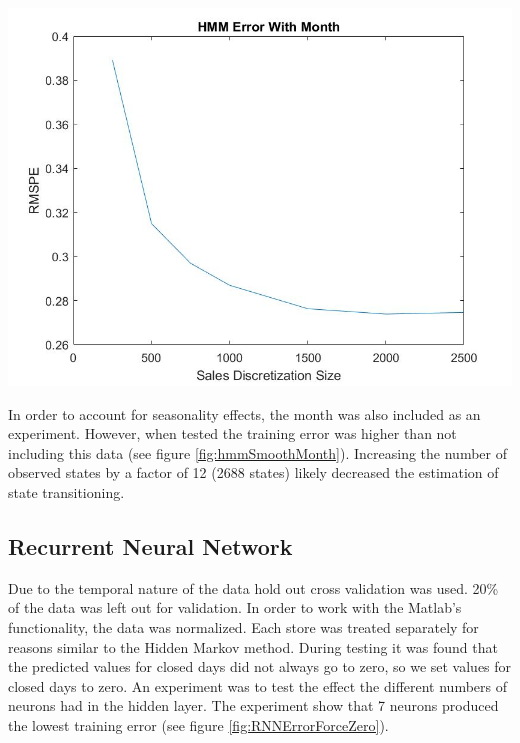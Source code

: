 \documentclass[twoside]{article}
\newenvironment{Figure}
{\par\medskip\noindent\minipage{\linewidth}}
{\endminipage\par\medskip}
\begin{document}
\begin{multicols}{2}
\begin{Figure}
    \centering
    \includegraphics[width=\linewidth]{images/learningWithMonthLabelHMM.jpg}
    \label{fig:hmmSmoothMonth}
\end{Figure}


In order to account for seasonality effects, the month was also included as an experiment. However, when tested the training error was higher than not including this data (see figure \ref{fig:hmmSmoothMonth}). Increasing the number of observed states by a factor of 12 (2688 states) likely decreased the estimation of state transitioning.





\subsection{Recurrent Neural Network}

\indent \indent Due to the temporal nature of the data hold out cross validation was used. 20\% of the data was left out for validation. In order to work with the Matlab's functionality, the data was normalized. Each store was treated separately for reasons similar to the Hidden Markov method. During testing it was found that the predicted values for closed days did not always go to zero, so we set values for closed days to zero. An experiment was to test the effect the different numbers of neurons had in the hidden layer. The experiment show that 7 neurons produced the lowest training error (see figure \ref{fig:RNNErrorForceZero}).


\end{multicols}
\end{document}
